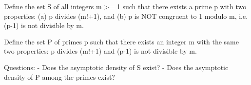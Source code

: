 Define the set S of all integers m >= 1 such that there exists a prime p with two properties:
  (a) p divides (m!+1), and
  (b) p is NOT congruent to 1 modulo m, i.e. (p-1) is not divisible by m.

Define the set P of primes p such that there exists an integer m with the same two properties:
  p divides (m!+1) and (p-1) is not divisible by m.

Questions:
- Does the asymptotic density of S exist?
- Does the asymptotic density of P among the primes exist?
